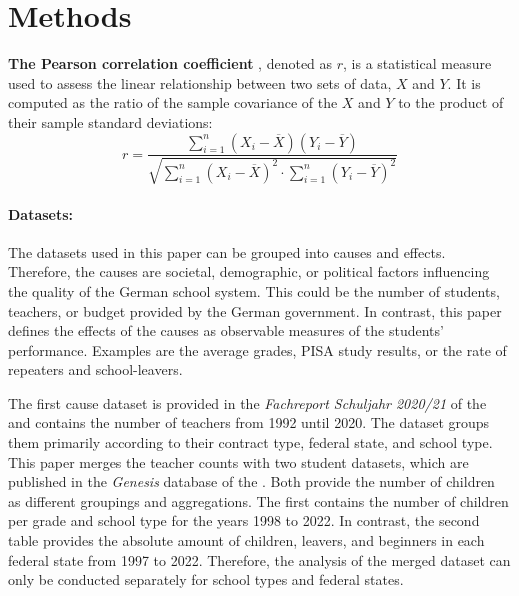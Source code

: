 \section*{Methods}



\textbf{The Pearson correlation coefficient} \cite{rodgers_thirteen_1988}, denoted as $r$, is a statistical measure used to assess the linear relationship between two sets of data, $X$ and $Y$. It is computed as the ratio of the sample covariance of the $X$ and $Y$ to the product of their sample standard deviations:
\begin{equation}
    r = \frac{\sum_{i=1}^n (X_i - \overline{X}) (Y_i - \overline{Y})}{\sqrt{\sum_{i=1}^n(X_i-\overline{X})^2 \cdot \sum_{i=1}^n(Y_i-\overline{Y})^2}}
\end{equation}


\paragraph{Datasets:}
The datasets used in this paper can be grouped into causes and effects. Therefore, the causes are societal, demographic, or political factors influencing the quality of the German school system. This could be the number of students, teachers, or budget provided by the German government. In contrast, this paper defines the effects of the causes as observable measures of the students' performance. Examples are the average grades, PISA study results, or the rate of repeaters and school-leavers.

The first cause dataset is provided in the \textit{Fachreport Schuljahr 2020/21} of the \citeauthor{statistische_bundesamt_allgemeinbildende_2022} and contains the number of teachers from 1992 until 2020. The dataset groups them primarily according to their contract type, federal state, and school type. This paper merges the teacher counts with two student datasets, which are published in the \textit{Genesis} database of the \citeauthor{statistische_bundesamt_statistisches_2023}. Both provide the number of children as different groupings and aggregations. The first contains the number of children per grade and school type  for the years 1998 to 2022. In contrast, the second table provides the absolute amount of children, leavers, and beginners in each federal state from 1997 to 2022. Therefore, the analysis of the merged dataset can only be conducted separately for school types and federal states.

